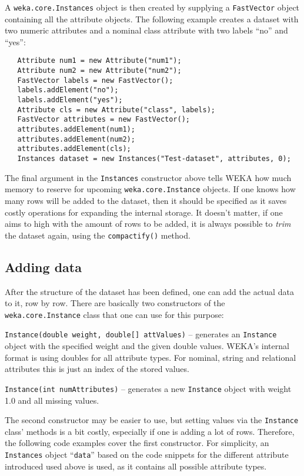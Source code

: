 A \texttt{weka.core.Instances} object is then created by supplying a
\texttt{FastVector} object containing all the attribute objects. The following
example creates a dataset with two numeric attributes and a nominal class
attribute with two labels ``no'' and ``yes'':
\begin{verbatim}
   Attribute num1 = new Attribute("num1");
   Attribute num2 = new Attribute("num2");
   FastVector labels = new FastVector();
   labels.addElement("no");
   labels.addElement("yes");
   Attribute cls = new Attribute("class", labels);
   FastVector attributes = new FastVector();
   attributes.addElement(num1);
   attributes.addElement(num2);
   attributes.addElement(cls);
   Instances dataset = new Instances("Test-dataset", attributes, 0);
\end{verbatim}
The final argument in the \texttt{Instances} constructor above tells WEKA how
much memory to reserve for upcoming \texttt{weka.core.Instance} objects. If one
knows how many rows will be added to the dataset, then it should be specified
as it saves costly operations for expanding the internal storage. It doesn't
matter, if one aims to high with the amount of rows to be added, it is always
possible to \textit{trim} the dataset again, using the \texttt{compactify()}
method.

\subsection{Adding data}
After the structure of the dataset has been defined, one can add the actual
data to it, row by row. There are basically two constructors of the
\texttt{weka.core.Instance} class that one can use for this purpose:
\begin{tight_itemize}
	\item \texttt{Instance(double weight, double[] attValues)} -- generates an
\texttt{Instance} object with the specified weight and the given double values.
WEKA's internal format is using doubles for all attribute types. For nominal,
string and relational attributes this is just an index of the stored values.
	\item \texttt{Instance(int numAttributes)} -- generates a new
\texttt{Instance} object with weight 1.0 and all missing values.
\end{tight_itemize}
The second constructor may be easier to use, but setting values via the
\texttt{Instance} class' methods is a bit costly, especially if one is
adding a lot of rows. Therefore, the following code examples cover the first
constructor. For simplicity, an \texttt{Instances} object ``\texttt{data}''
based on the code snippets for the different attribute introduced used above is
used, as it contains all possible attribute types.

